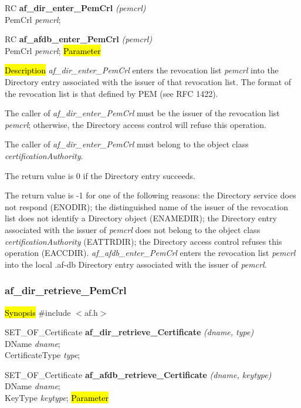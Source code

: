 RC {\bf af\_dir\_enter\_PemCrl} {\em (pemcrl)} \\
PemCrl {\em *pemcrl};

RC {\bf af\_afdb\_enter\_PemCrl} {\em (pemcrl)} \\
PemCrl {\em *pemcrl};
\hl{Parameter}

\hl{Description}
{\em af\_dir\_enter\_PemCrl} enters the revocation list {\em pemcrl} into 
the Directory entry associated with the issuer of that revocation list.
The format of the revocation list is that defined by PEM (see RFC 1422).

The caller of {\em af\_dir\_enter\_PemCrl} must be the issuer of the revocation list
{\em pemcrl}; otherwise, the Directory access control will 
refuse this operation.

The caller of {\em af\_dir\_enter\_PemCrl} must belong to the object class 
{\em certificationAuthority}.

The return value is 0 if the Directory entry succeeds.

The return value is -1 for one of the following reasons:
\bi
\m the Directory service does not respond (ENODIR);
\m the distinguished name of the issuer of the revocation list does not identify a Directory 
object (ENAMEDIR);
\m the Directory entry associated with the issuer of {\em pemcrl} does not belong to the
object class {\em certificationAuthority} (EATTRDIR);
\m the Directory access control refuses this operation (EACCDIR).
\ei
{\em af\_afdb\_enter\_PemCrl} enters the revocation list {\em pemcrl} 
into the local .af-db Directory entry associated with the issuer of {\em pemcrl}.



\subsubsection{af\_dir\_retrieve\_PemCrl}
\hl{Synopsis}
\#include $<$af.h$>$

SET\_OF\_Certificate {\bf *af\_dir\_retrieve\_Certificate} {\em (dname, type)} \\
DName {\em *dname}; \\
CertificateType {\em type}; 

SET\_OF\_Certificate {\bf *af\_afdb\_retrieve\_Certificate} {\em (dname, keytype)} \\
DName {\em *dname}; \\
KeyType {\em keytype};
\hl{Parameter}

